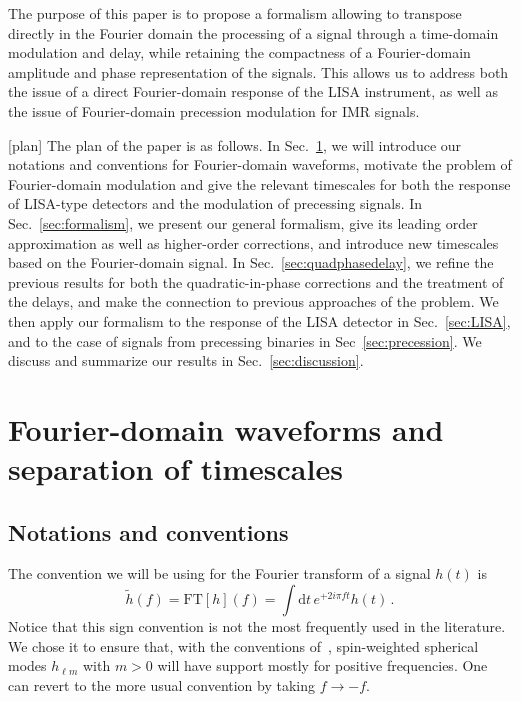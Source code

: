\documentclass[aps,showpacs,%
prd,superscriptaddress,nofootinbib]{revtex4}
\newcommand{\be}{\begin{equation}}
\newcommand{\ee}{\end{equation}}
\newcommand\ud{{\mathrm{d}}}
\begin{document}
The purpose of this paper is to propose a formalism allowing to transpose directly in the Fourier domain the processing of a signal through a time-domain modulation and delay, while retaining the compactness of a Fourier-domain amplitude and phase representation of the signals. This allows us to address both the issue of a direct Fourier-domain response of the LISA instrument, as well as the issue of Fourier-domain precession modulation for IMR signals.

[plan]
The plan of the paper is as follows. In Sec.~\ref{sec:motivation}, we will introduce our notations and conventions for Fourier-domain waveforms, motivate the problem of Fourier-domain modulation and give the relevant timescales for both the response of LISA-type detectors and the modulation of precessing signals. In Sec.~\ref{sec:formalism}, we present our general formalism, give its leading order approximation as well as higher-order corrections, and introduce new timescales based on the Fourier-domain signal. In Sec.~\ref{sec:quadphasedelay}, we refine the previous results for both the quadratic-in-phase corrections and the treatment of the delays, and make the connection to previous approaches of the problem. We then apply our formalism to the response of the LISA detector in Sec.~\ref{sec:LISA}, and to the case of signals from precessing binaries in Sec~\ref{sec:precession}. We discuss and summarize our results in Sec.~\ref{sec:discussion}.


\section{Fourier-domain waveforms and separation of timescales}
\label{sec:motivation}


\subsection{Notations and conventions}
\label{subsec:notations}

The convention we will be using for the Fourier transform of a signal $h(t)$ is
\be\label{eq:defFT}
	\tilde{h}(f) = \mathrm{FT}[h](f) =  \int \ud t \, e^{+2i\pi f t} h(t) \,.
\ee
Notice that this sign convention is not the most frequently used in the literature. We chose it to ensure that, with the conventions of~\cite{BlanchetLiving}, spin-weighted spherical modes $h_{\ell m}$ with $m>0$ will have support mostly for positive frequencies. One can revert to the more usual convention by taking $f\rightarrow -f$.
\end{document}
